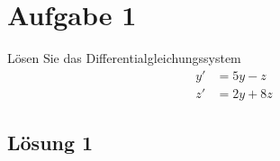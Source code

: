 \documentclass[main.tex]{subfiles}
\begin{document}
\section{Aufgabe 1}
Lösen Sie das Differentialgleichungssystem
\begin{align*}
    y' &= 5y -  z \\
    z' &= 2y + 8z
\end{align*}

\subsection{Lösung 1}
\end{document}
